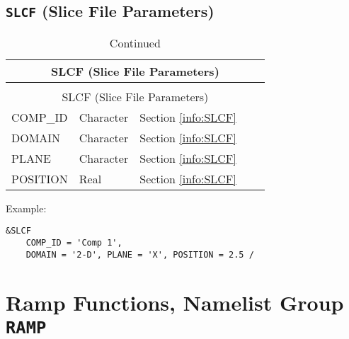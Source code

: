 \subsection{\texorpdfstring{{\tt SLCF}}{SLCF} (Slice File Parameters)}
\begin{longtable}{@{\extracolsep{\fill}}|l|l|l|l|l|}
\caption[Slice File parameters ({\ct SLCF} namelist group)]{For more information see Section~\ref{info:SLCF}.}
\label{tbl:SLCF} \\
\hline
\multicolumn{5}{|c|}{{\ct SLCF} (Slice File Parameters)} \\
\hline \hline
\endfirsthead
\caption[]{Continued} \\
\hline
\multicolumn{5}{|c|}{{\ct SLCF} (Slice File Parameters)} \\
\hline \hline
\endhead
{\ct COMP\_ID}        & Character   & Section \ref{info:SLCF}                 &           &                 \\ \hline
{\ct DOMAIN}            & Character   & Section \ref{info:SLCF}                 &           &                 \\ \hline
{\ct PLANE}             & Character   & Section \ref{info:SLCF}                 &           &                 \\ \hline
{\ct POSITION}          & Real        & Section \ref{info:SLCF}                 &           &                 \\ \hline
\end{longtable}

\noindent Example:
\begin{lstlisting}
&SLCF
	COMP_ID = 'Comp 1',
	DOMAIN = '2-D', PLANE = 'X', POSITION = 2.5 /
\end{lstlisting}




\clearpage
\section{Ramp Functions, Namelist Group \texorpdfstring{{\tt RAMP}}{RAMP}}
\label{info:RAMP}
\label{info:RAMP2}

